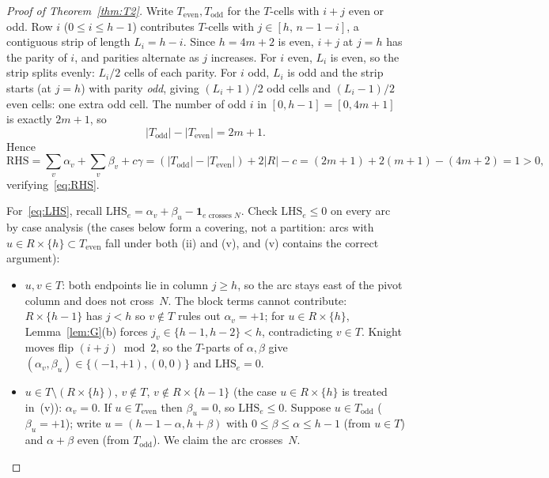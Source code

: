 \documentclass[10pt,a4paper]{amsart}
\newcommand{\LHS}{\mathrm{LHS}}
\newcommand{\RHS}{\mathrm{RHS}}
\begin{document}
\begin{proof}[Proof of Theorem~\ref{thm:T2}]
Write $T_{\mathrm{even}}, T_{\mathrm{odd}}$ for the $T$-cells with
$i+j$ even or odd.  Row $i$ ($0\le i\le h-1$) contributes $T$-cells
with $j\in[h,\,n-1-i]$, a contiguous strip of length $L_i=h-i$.
Since $h=4m+2$ is even, $i+j$ at $j=h$ has the parity of $i$, and
parities alternate as $j$ increases.  For $i$ even, $L_i$ is even,
so the strip splits evenly:  $L_i/2$ cells of each parity.  For $i$
odd, $L_i$ is odd and the strip starts (at $j=h$) with parity
\emph{odd}, giving $(L_i+1)/2$ odd cells and $(L_i-1)/2$ even cells:
one extra odd cell.  The number of odd $i$ in $[0,h-1]=[0,4m+1]$ is
exactly $2m+1$, so
\begin{equation}\label{eq:parity}
  |T_{\mathrm{odd}}| - |T_{\mathrm{even}}| = 2m+1.
\end{equation}
Hence
\[
  \RHS = \sum_v\alpha_v + \sum_v\beta_v + c\gamma
       = (|T_{\mathrm{odd}}|-|T_{\mathrm{even}}|) + 2|R| - c
       = (2m+1)+2(m+1)-(4m+2) = 1>0,
\]
verifying~\eqref{eq:RHS}.

For~\eqref{eq:LHS}, recall
$\LHS_e = \alpha_v + \beta_u - \mathbf{1}_{e\text{ crosses }N}$.
Check $\LHS_e\le 0$ on every arc by case analysis (the cases below
form a covering, not a partition: arcs with $u\in R\times\{h\}\subset
T_{\mathrm{even}}$ fall under both (ii) and (v), and (v) contains the
correct argument):
\begin{itemize}
\item[(i)] $u,v\in T$:  both endpoints lie in column $j\ge h$, so
the arc stays east of the pivot column and does not cross~$N$.
The block terms cannot contribute:  $R\times\{h-1\}$ has $j<h$
so $v\notin T$ rules out $\alpha_v=+1$;  for $u\in R\times\{h\}$,
Lemma~\ref{lem:G}(b) forces $j_v\in\{h-1,h-2\}<h$, contradicting
$v\in T$.  Knight moves flip $(i+j)\bmod 2$, so the $T$-parts of
$\alpha,\beta$ give $(\alpha_v,\beta_u)\in\{(-1,+1),(0,0)\}$ and
$\LHS_e=0$.

\item[(ii)] $u\in T\setminus(R\times\{h\})$, $v\notin T$,
$v\notin R\times\{h-1\}$ (the case $u\in R\times\{h\}$ is treated
in~(v)):  $\alpha_v=0$.  If $u\in T_{\mathrm{even}}$ then
$\beta_u=0$, so $\LHS_e\le 0$.  Suppose $u\in T_{\mathrm{odd}}$
($\beta_u=+1$);
write $u=(h-1-\alpha,h+\beta)$ with $0\le\beta\le\alpha\le h-1$
(from $u\in T$) and $\alpha+\beta$ even (from $T_{\mathrm{odd}}$).
We claim the arc crosses~$N$.


\end{itemize}
\end{proof}
\end{document}
